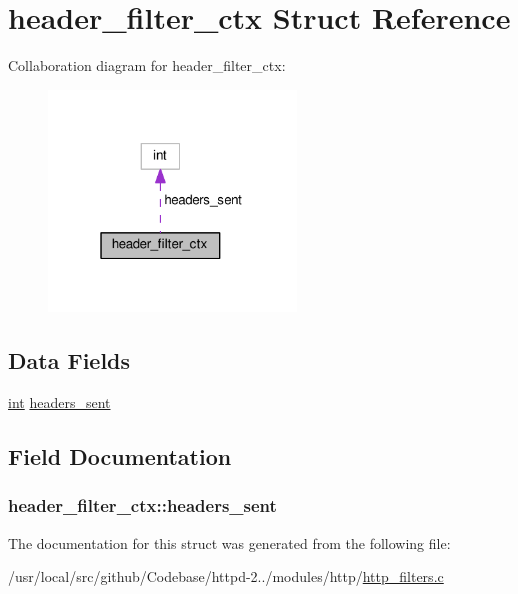 \hypertarget{structheader__filter__ctx}{}\section{header\+\_\+filter\+\_\+ctx Struct Reference}
\label{structheader__filter__ctx}


Collaboration diagram for header\+\_\+filter\+\_\+ctx\+:
\nopagebreak
\begin{figure}[H]
\begin{center}
\leavevmode
\includegraphics[width=187pt]{structheader__filter__ctx__coll__graph}
\end{center}
\end{figure}
\subsection*{Data Fields}
\begin{DoxyCompactItemize}
\item 
\hyperlink{pcre_8txt_a42dfa4ff673c82d8efe7144098fbc198}{int} \hyperlink{structheader__filter__ctx_a0c750e96122e663ae7396540ff956115}{headers\+\_\+sent}
\end{DoxyCompactItemize}


\subsection{Field Documentation}
\subsubsection[{\texorpdfstring{headers\+\_\+sent}{headers_sent}}]{ header\+\_\+filter\+\_\+ctx\+::headers\+\_\+sent}\hypertarget{structheader__filter__ctx_a0c750e96122e663ae7396540ff956115}{}\label{structheader__filter__ctx_a0c750e96122e663ae7396540ff956115}


The documentation for this struct was generated from the following file\+:\begin{DoxyCompactItemize}
\item 
/usr/local/src/github/\+Codebase/httpd-\/2../modules/http/\hyperlink{http__filters_8c}{http\+\_\+filters.\+c}\end{DoxyCompactItemize}
